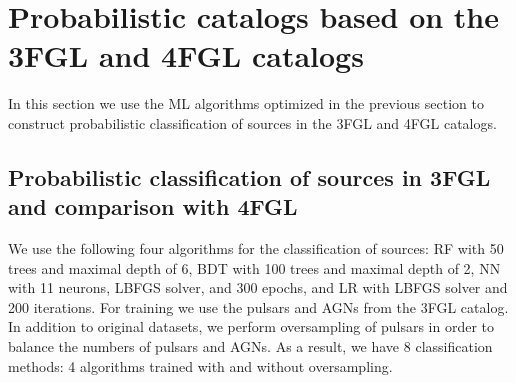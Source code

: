\section{Probabilistic catalogs based on the 3FGL and 4FGL catalogs}

In this section we use the ML algorithms optimized in the previous section to construct probabilistic
classification of sources in the 3FGL and 4FGL catalogs.


\subsection{Probabilistic classification of sources in 3FGL and comparison with 4FGL}


We use the following four algorithms for the classification of sources: RF with 50 trees and maximal depth of 6, BDT with 100 trees and maximal depth of 2, NN with 11 neurons, LBFGS solver, and 300 epochs, and LR with LBFGS solver and 200 iterations. 
For training we use the pulsars and AGNs from the 3FGL catalog. In addition to original datasets, we perform oversampling of pulsars in order to balance the numbers of pulsars and AGNs.
As a result, we have 8 classification methods: 4 algorithms trained with and without oversampling.


